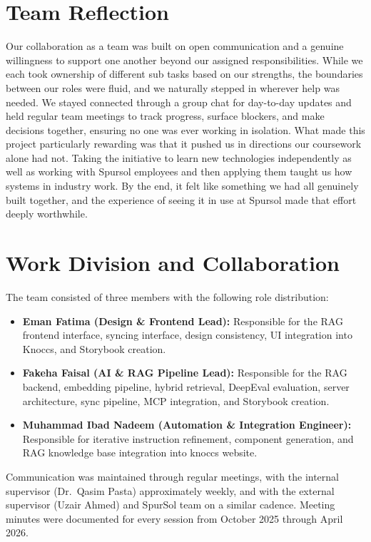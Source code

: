 \section{Team Reflection}
Our collaboration as a team was built on open communication and a genuine willingness to support one another beyond our assigned responsibilities. While we each took ownership of different sub tasks based on our strengths, the boundaries between our roles were fluid, and we naturally stepped in wherever help was needed. We stayed connected through a group chat for day-to-day updates and held regular team meetings to track progress, surface blockers, and make decisions together, ensuring no one was ever working in isolation. What made this project particularly rewarding was that it pushed us in directions our coursework alone had not. Taking the initiative to learn new technologies independently as well as working with Spursol employees and then applying them taught us how systems in industry work. By the end, it felt like something we had all genuinely built together, and the experience of seeing it in use at Spursol made that effort deeply worthwhile.

\section{Work Division and Collaboration}

The team consisted of three members with the following role distribution:
\begin{itemize}
    \item \textbf{Eman Fatima (Design \& Frontend Lead):} Responsible for the RAG frontend interface, syncing interface, design consistency, UI integration into Knoccs, and Storybook creation.
    \item \textbf{Fakeha Faisal (AI \& RAG Pipeline Lead):} Responsible for the RAG backend, embedding pipeline, hybrid retrieval, DeepEval evaluation, server architecture, sync pipeline, MCP integration, and Storybook creation.
    \item \textbf{Muhammad Ibad Nadeem (Automation \& Integration Engineer):} Responsible for iterative instruction refinement, component generation, and RAG knowledge base integration into knoccs website.
\end{itemize}

Communication was maintained through regular meetings, with the internal supervisor (Dr.\ Qasim Pasta) approximately weekly, and with the external supervisor (Uzair Ahmed) and SpurSol team on a similar cadence. Meeting minutes were documented for every session from October 2025 through April 2026.

